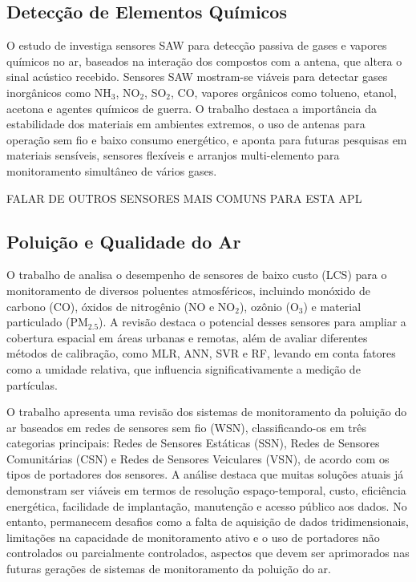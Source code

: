 \documentclass[conference]{IEEEtran}
\begin{document}
\subsection{Detecção de Elementos Químicos}

O estudo de \textcite{devkota_2017_saw} investiga sensores SAW para detecção passiva de gases e vapores químicos no ar, baseados na interação dos compostos com a antena, que altera o sinal acústico recebido. Sensores SAW mostram-se viáveis para detectar gases inorgânicos como NH$_3$, NO$_2$, SO$_2$, CO, vapores orgânicos como tolueno, etanol, acetona e agentes químicos de guerra.
O trabalho destaca a importância da estabilidade dos materiais em ambientes extremos, o uso de antenas para operação sem fio e baixo consumo energético, e aponta para futuras pesquisas em materiais sensíveis, sensores flexíveis e arranjos multi-elemento para monitoramento simultâneo de vários gases.

FALAR DE OUTROS SENSORES MAIS COMUNS PARA ESTA APL

\subsection{Poluição e Qualidade do Ar}
O trabalho de \textcite{karagulian_2019_review} analisa o desempenho de sensores de baixo custo (LCS) para o monitoramento de diversos poluentes atmosféricos, incluindo monóxido de carbono (CO), óxidos de nitrogênio (NO e NO$_2$), ozônio (O$_3$) e material particulado (PM$_{2.5}$). A revisão destaca o potencial desses sensores para ampliar a cobertura espacial em áreas urbanas e remotas, além de avaliar diferentes métodos de calibração, como MLR, ANN, SVR e RF, levando em conta fatores como a umidade relativa, que influencia significativamente a medição de partículas.

O trabalho \textcite{yi_2015_a} apresenta uma revisão dos sistemas de monitoramento da poluição do ar baseados em redes de sensores sem fio (WSN), classificando-os em três categorias principais: Redes de Sensores Estáticas (SSN), Redes de Sensores Comunitárias (CSN) e Redes de Sensores Veiculares (VSN), de acordo com os tipos de portadores dos sensores. A análise destaca que muitas soluções atuais já demonstram ser viáveis em termos de resolução espaço-temporal, custo, eficiência energética, facilidade de implantação, manutenção e acesso público aos dados. No entanto, permanecem desafios como a falta de aquisição de dados tridimensionais, limitações na capacidade de monitoramento ativo e o uso de portadores não controlados ou parcialmente controlados, aspectos que devem ser aprimorados nas futuras gerações de sistemas de monitoramento da poluição do ar.
\end{document}
